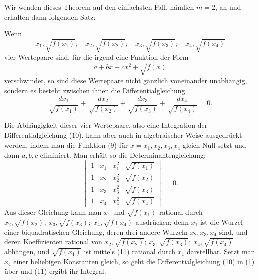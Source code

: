 \documentclass[11pt]{article}
\begin{document}
Wir wenden dieses Theorem auf den einfachsten Fall, nämlich $m=2$, an und erhalten dann folgenden Satz:

Wenn
\begin{equation}
x_1,\sqrt{f(x_1)};\quad x_2,\sqrt{f(x_2)};\quad
x_3,\sqrt{f(x_3)};\quad x_4,\sqrt{f(x_4)}
\tag{8}
\end{equation}
vier Wertepaare sind, für die irgend eine Funktion der Form
\begin{equation}
a+bx+cx^2+\sqrt{f(x)}
\tag{9}
\end{equation}
verschwindet, so sind diese Wertepaare nicht gänzlich voneinander unabhängig, sondern es besteht zwischen ihnen die Differentialgleichung
\begin{equation}
\frac{dx_1}{\sqrt{f(x_1)}}+
\frac{dx_2}{\sqrt{f(x_2)}}+
\frac{dx_3}{\sqrt{f(x_3)}}+
\frac{dx_4}{\sqrt{f(x_4)}}=0.
\tag{10}
\end{equation}

Die Abhängigkeit dieser vier Wertepaare, also eine Integration der Differentialgleichung (10), kann aber auch in algebraischer Weise ausgedrückt werden, indem man die Funktion (9) für $x=x_1,x_2,x_3,x_4$ gleich Null setzt und dann $a,b,c$ eliminiert. Man erhält so die Determinantengleichung:
\begin{equation}
\begin{vmatrix}
1&x_1&x_1^2&\sqrt{f(x_1)}\\
1&x_2&x_2^2&\sqrt{f(x_2)}\\
1&x_3&x_3^2&\sqrt{f(x_3)}\\
1&x_4&x_4^2&\sqrt{f(x_4)}
\end{vmatrix}=0.
\tag{11}
\end{equation}
Aus dieser Gleichung kann man $x_1$ und $\sqrt{f(x_1)}$ rational durch $x_2,\sqrt{f(x_2)};\ x_3,\sqrt{f(x_3)};\ x_4,\sqrt{f(x_4)}$ ausdrücken; denn $x_1$ ist die Wurzel einer biquadratischen Gleichung, deren drei andere Wurzeln $x_2,x_3,x_4$ sind, und deren Koeffizienten rational von $x_2,\sqrt{f(x_2)};\ x_3,\sqrt{f(x_3)};\ x_4,\sqrt{f(x_4)}$ abhängen, und $\sqrt{f(x_1)}$ ist mittels (11) rational durch $x_1$ darstellbar. Setzt man $x_4$ einer beliebigen Konstanten gleich, so geht die Differentialgleichung (10) in (1) über und (11) ergibt ihr Integral.
\end{document}
